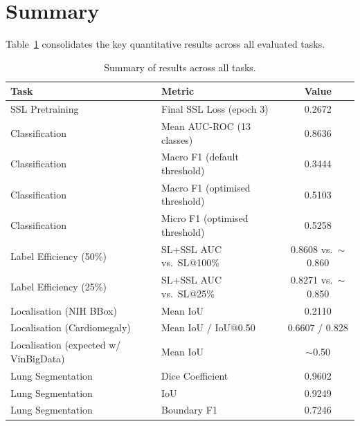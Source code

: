 \section{Summary}
\label{sec:results_summary}

Table~\ref{tab:results_summary} consolidates the key quantitative results across all evaluated tasks.

\begin{table}[ht]
\centering
\caption{Summary of results across all tasks.}
\label{tab:results_summary}
\renewcommand{\arraystretch}{1.3}
\begin{tabular}{llc}
\toprule
\textbf{Task} & \textbf{Metric} & \textbf{Value} \\
\midrule
SSL Pretraining              & Final SSL Loss (epoch 3)              & 0.2672 \\
Classification               & Mean AUC-ROC (13 classes)             & 0.8636 \\
Classification               & Macro F1 (default threshold)          & 0.3444 \\
Classification               & Macro F1 (optimised threshold)        & 0.5103 \\
Classification               & Micro F1 (optimised threshold)        & 0.5258 \\
Label Efficiency (50\%)      & SL+SSL AUC vs.\ SL@100\%             & 0.8608 vs.\ $\sim$0.860 \\
Label Efficiency (25\%)      & SL+SSL AUC vs.\ SL@25\%              & 0.8271 vs.\ $\sim$0.850 \\
Localisation (NIH BBox)      & Mean IoU                              & 0.2110 \\
Localisation (Cardiomegaly)  & Mean IoU / IoU@0.50                   & 0.6607 / 0.828 \\
Localisation (expected w/ VinBigData) & Mean IoU                     & $\sim$0.50 \\
Lung Segmentation            & Dice Coefficient                      & 0.9602 \\
Lung Segmentation            & IoU                                   & 0.9249 \\
Lung Segmentation            & Boundary F1                           & 0.7246 \\
\bottomrule
\end{tabular}
\end{table}


